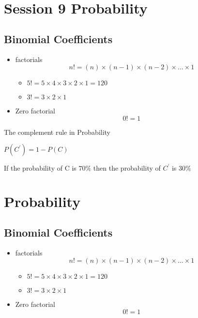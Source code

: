 \documentclass[]{report}
\begin{document}
\section*{Session 9 Probability}
\subsection*{Binomial Coefficients}
\begin{itemize}
\item factorials 
\[ n! = (n)\times (n-1)\times(n-2) \times \ldots \times 1 \]
\begin{itemize}
\item $5! = 5 \times 4 \times 3 \times 2 \times 1 = 120 $
\item $3! = 3 \times 2 \times 1$
\end{itemize}
\item Zero factorial
\[ 0! =  1 \]
\end{itemize}


The complement rule in Probability

$P(C^{\prime}) = 1- P(C)$



If the probability of C is $70 \%$ then the probability of $C^{\prime}$ is $30\%$


\section*{Probability}
\subsection*{Binomial Coefficients}
\begin{itemize}
\item factorials 
\[ n! = (n)\times (n-1)\times(n-2) \times \ldots \times 1 \]
\begin{itemize}
\item $5! = 5 \times 4 \times 3 \times 2 \times 1 = 120 $
\item $3! = 3 \times 2 \times 1$
\end{itemize}
\item Zero factorial
\[ 0! =  1 \]
\end{itemize}
\end{document}
